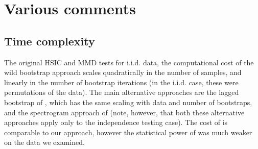 \section{Various comments}

\subsection{Time complexity}
The original HSIC and MMD tests for i.i.d. data, the computational cost of the wild bootstrap approach scales quadratically in the number of samples, and linearly in the number of bootstrap iterations (in the i.i.d. case, these were permutations of the data). The main alternative approaches are the lagged bootstrap of \cite{chwialkowski2014kernel}, which has the same scaling with data and number of bootstraps, and the spectrogram approach of \cite{besserve_statistical_2013} (note, however, that both these alternative approaches apply only to the independence testing case). The cost of \cite{besserve_statistical_2013} is comparable to our approach, however the statistical power of \cite{besserve_statistical_2013} was much weaker on the data we examined.
